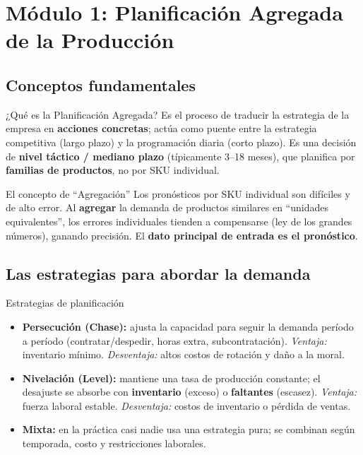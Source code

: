 \section{Módulo 1: Planificación Agregada de la Producción}

\subsection{Conceptos fundamentales}

\begin{definicion}{¿Qué es la Planificación Agregada?}
Es el proceso de traducir la estrategia de la empresa en \textbf{acciones concretas}; actúa como puente entre la estrategia competitiva (largo plazo) y la programación diaria (corto plazo). Es una decisión de \textbf{nivel táctico / mediano plazo} (típicamente 3--18 meses), que planifica por \textbf{familias de productos}, no por SKU individual.
\end{definicion}

\begin{definicion}{El concepto de ``Agregación''}
Los pronósticos por SKU individual son difíciles y de alto error. Al \textbf{agregar} la demanda de productos similares en ``unidades equivalentes'', los errores individuales tienden a compensarse (ley de los grandes números), ganando precisión. El \textbf{dato principal de entrada es el pronóstico}.
\end{definicion}

\subsection{Las estrategias para abordar la demanda}

\begin{definicion}{Estrategias de planificación}
\begin{itemize}[leftmargin=1.4em, itemsep=2pt]
  \item \textbf{Persecución (Chase):} ajusta la capacidad para seguir la demanda período a período (contratar/despedir, horas extra, subcontratación). \textit{Ventaja:} inventario mínimo. \textit{Desventaja:} altos costos de rotación y daño a la moral.
  \item \textbf{Nivelación (Level):} mantiene una tasa de producción constante; el desajuste se absorbe con \textbf{inventario} (exceso) o \textbf{faltantes} (escasez). \textit{Ventaja:} fuerza laboral estable. \textit{Desventaja:} costos de inventario o pérdida de ventas.
  \item \textbf{Mixta:} en la práctica casi nadie usa una estrategia pura; se combinan según temporada, costo y restricciones laborales.
\end{itemize}
\end{definicion}


